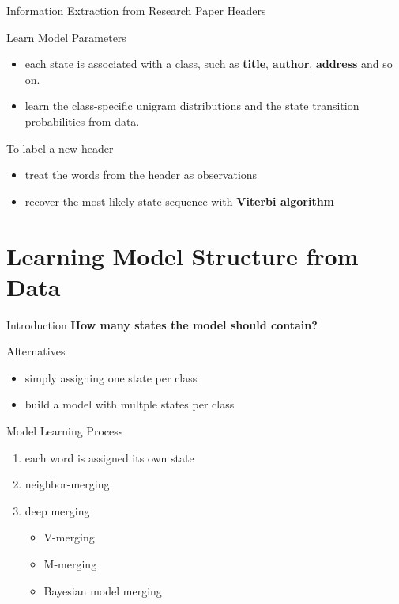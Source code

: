 \documentclass{beamer}
\begin{document}
\begin{frame}{ Information Extraction from Research Paper Headers}
    \begin{block}{Learn Model Parameters}
        \begin{itemize}
            \item each state is associated with a class, such as \textbf{title}, \textbf{author}, \textbf{address} and so on.
            \item learn the class-specific unigram distributions and the state transition probabilities from  data.
        \end{itemize}
    \end{block}
    
    \begin{block}{ To label a new header}
        \begin{itemize}
            \item treat the words from the header as observations
            \item recover the most-likely state sequence with \textbf{Viterbi algorithm}
        \end{itemize}
    \end{block}
\end{frame}

\section{Learning Model Structure from Data}
\begin{frame}{Introduction}
    \textbf{How many states the model should contain?}
    \begin{block}{ Alternatives}
        \begin{itemize}
            \item simply assigning one state per class
            \item build a model with multple states per class
        \end{itemize}
    \end{block}
\end{frame}

\begin{frame}{Model Learning Process}
    \begin{enumerate}
        \item each word is assigned its own state
        \item neighbor-merging
        \item deep merging
            \begin{itemize}
                \item V-merging
                \item M-merging
                \item Bayesian model merging
            \end{itemize}
    \end{enumerate}
\end{frame}
\end{document}
